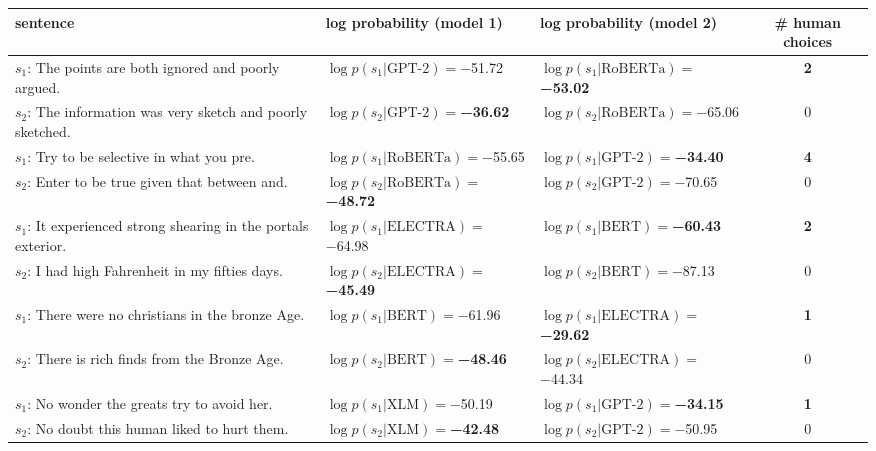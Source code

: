 \begin{tabularx}{\textwidth}{lllc}
\toprule
                                                       sentence &                               log probability (model 1) &                               log probability (model 2) &  \# human choices \\
\midrule
          $s_1$: The points are both ignored and poorly argued. &             $\log p(s_1 | \textrm{GPT-2})=$\num{-51.72} &  $\log p(s_1 | \textrm{RoBERTa})=$\textbf{\num{-53.02}} &  \textbf{\num{2}} \\
    $s_2$: The information was very sketch and poorly sketched. &    $\log p(s_2 | \textrm{GPT-2})=$\textbf{\num{-36.62}} &           $\log p(s_2 | \textrm{RoBERTa})=$\num{-65.06} &           \num{0} \\\midrule
                    $s_1$: Try to be selective in what you pre. &           $\log p(s_1 | \textrm{RoBERTa})=$\num{-55.65} &    $\log p(s_1 | \textrm{GPT-2})=$\textbf{\num{-34.40}} &  \textbf{\num{4}} \\
                $s_2$: Enter to be true given that between and. &  $\log p(s_2 | \textrm{RoBERTa})=$\textbf{\num{-48.72}} &             $\log p(s_2 | \textrm{GPT-2})=$\num{-70.65} &           \num{0} \\\midrule
 $s_1$: It experienced strong shearing in the portals exterior. &           $\log p(s_1 | \textrm{ELECTRA})=$\num{-64.98} &     $\log p(s_1 | \textrm{BERT})=$\textbf{\num{-60.43}} &  \textbf{\num{2}} \\
               $s_2$: I had high Fahrenheit in my fifties days. &  $\log p(s_2 | \textrm{ELECTRA})=$\textbf{\num{-45.49}} &              $\log p(s_2 | \textrm{BERT})=$\num{-87.13} &           \num{0} \\\midrule
             $s_1$: There were no christians in the bronze Age. &              $\log p(s_1 | \textrm{BERT})=$\num{-61.96} &  $\log p(s_1 | \textrm{ELECTRA})=$\textbf{\num{-29.62}} &  \textbf{\num{1}} \\
                $s_2$: There is rich finds from the Bronze Age. &     $\log p(s_2 | \textrm{BERT})=$\textbf{\num{-48.46}} &           $\log p(s_2 | \textrm{ELECTRA})=$\num{-44.34} &           \num{0} \\\midrule
                  $s_1$: No wonder the greats try to avoid her. &               $\log p(s_1 | \textrm{XLM})=$\num{-50.19} &    $\log p(s_1 | \textrm{GPT-2})=$\textbf{\num{-34.15}} &  \textbf{\num{1}} \\
                 $s_2$: No doubt this human liked to hurt them. &      $\log p(s_2 | \textrm{XLM})=$\textbf{\num{-42.48}} &             $\log p(s_2 | \textrm{GPT-2})=$\num{-50.95} &           \num{0} \\\midrule

\end{tabularx}
